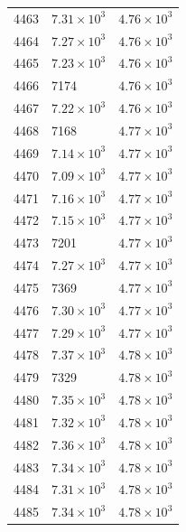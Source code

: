 \begin{table}[H]
\begin{tabular}{lll}
4463 & $\displaystyle 7.31 \times 10^{3}$ & $\displaystyle 4.76 \times 10^{3}$ \\
4464 & $\displaystyle 7.27 \times 10^{3}$ & $\displaystyle 4.76 \times 10^{3}$ \\
4465 & $\displaystyle 7.23 \times 10^{3}$ & $\displaystyle 4.76 \times 10^{3}$ \\
4466 & 7174 & $\displaystyle 4.76 \times 10^{3}$ \\
4467 & $\displaystyle 7.22 \times 10^{3}$ & $\displaystyle 4.76 \times 10^{3}$ \\
4468 & 7168 & $\displaystyle 4.77 \times 10^{3}$ \\
4469 & $\displaystyle 7.14 \times 10^{3}$ & $\displaystyle 4.77 \times 10^{3}$ \\
4470 & $\displaystyle 7.09 \times 10^{3}$ & $\displaystyle 4.77 \times 10^{3}$ \\
4471 & $\displaystyle 7.16 \times 10^{3}$ & $\displaystyle 4.77 \times 10^{3}$ \\
4472 & $\displaystyle 7.15 \times 10^{3}$ & $\displaystyle 4.77 \times 10^{3}$ \\
4473 & 7201 & $\displaystyle 4.77 \times 10^{3}$ \\
4474 & $\displaystyle 7.27 \times 10^{3}$ & $\displaystyle 4.77 \times 10^{3}$ \\
4475 & 7369 & $\displaystyle 4.77 \times 10^{3}$ \\
4476 & $\displaystyle 7.30 \times 10^{3}$ & $\displaystyle 4.77 \times 10^{3}$ \\
4477 & $\displaystyle 7.29 \times 10^{3}$ & $\displaystyle 4.77 \times 10^{3}$ \\
4478 & $\displaystyle 7.37 \times 10^{3}$ & $\displaystyle 4.78 \times 10^{3}$ \\
4479 & 7329 & $\displaystyle 4.78 \times 10^{3}$ \\
4480 & $\displaystyle 7.35 \times 10^{3}$ & $\displaystyle 4.78 \times 10^{3}$ \\
4481 & $\displaystyle 7.32 \times 10^{3}$ & $\displaystyle 4.78 \times 10^{3}$ \\
4482 & $\displaystyle 7.36 \times 10^{3}$ & $\displaystyle 4.78 \times 10^{3}$ \\
4483 & $\displaystyle 7.34 \times 10^{3}$ & $\displaystyle 4.78 \times 10^{3}$ \\
4484 & $\displaystyle 7.31 \times 10^{3}$ & $\displaystyle 4.78 \times 10^{3}$ \\
4485 & $\displaystyle 7.34 \times 10^{3}$ & $\displaystyle 4.78 \times 10^{3}$ \\

\end{tabular}
\end{table}
